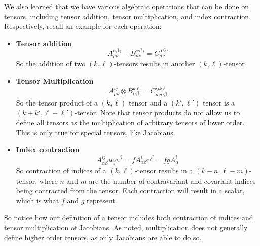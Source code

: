 \documentclass{article}
\begin{document}
 			We also learned that we have various algebraic operations that can be done on tensors, including tensor addition, tensor multiplication, and index contraction. Respectively, recall an example for each operation:
 			\begin{itemize}
 				\item \textbf{Tensor addition}
 				$$ A^{\alpha\beta\gamma}_{\mu\nu} + B^{\alpha\beta\gamma}_{\mu\nu} = C^{\alpha\beta\gamma}_{\mu\nu}$$
 				So the addition of two $(k,\ell)$-tensors results in another $(k,\ell)$-tensor
 				
 				\item \textbf{Tensor Multiplication}
 				$$ A^{ij}_{\mu\nu} \otimes B^{k\ell}_{\alpha\beta} = C^{ijk\ell}_{\mu\nu\alpha\beta}$$
 				So the tensor product of a $(k, \ell)$ tensor and a $(k', \ell')$ tensor is a $(k+k', \ell+\ell')$-tensor. Note that tensor products do not allow us to define all tensors as the multiplication of arbitrary tensors of lower order. This is only true for special tensors, like Jacobians. 
 				
 				\item \textbf{Index contraction}
 				$$ A^{ij}_{\alpha\beta}w_jv^\beta = fA^{i}_{\alpha\beta}v^\beta = fgA^i_\alpha$$
 				So contraction of indices of a $(k, \ell)$-tensor results in a $(k-n,\ell-m)$-tensor, where $n$ and $m$ are the number of contravariant and covariant indices being contracted from the tensor. Each contraction will result in a scalar, which is what $f$ and $g$ represent.
 				
 			\end{itemize}
 			So notice how our definition of a tensor includes both contraction of indices and tensor multiplication of Jacobians. As noted, multiplication does not generally define higher order tensors, as only Jacobians are able to do so. 
 			
\end{document}
